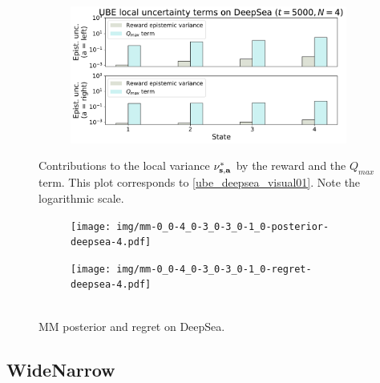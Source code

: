 \documentclass{article}
\begin{document}
\begin{appendices}
\begin{figure}[h!]
\centering
\begin{subfigure}{0.7\textwidth}
\includegraphics[width=\linewidth]{img/ube-uncertainty-terms.pdf}
\end{subfigure}
\captionsetup{width=0.9\linewidth}
\caption{Contributions to the local variance $\nu^*_{\mathbf{s}, \mathbf{a}}$ by the reward and the $Q_{max}$ term. This plot corresponds to \cref{ube_deepsea_visual01}. Note the logarithmic scale.}\label{ube_unc_terms}
\end{figure}

\begin{figure}[h!]
\centering
\begin{subfigure}{0.65\textwidth}
\texttt{[image: img/mm-0\_0-4\_0-3\_0-3\_0-1\_0-posterior-deepsea-4.pdf]}
\end{subfigure}
\begin{subfigure}{0.34\textwidth}
\texttt{[image: img/mm-0\_0-4\_0-3\_0-3\_0-1\_0-regret-deepsea-4.pdf]}~\\~\\
\end{subfigure}
\captionsetup{width=0.9\linewidth}
\caption{MM posterior and regret on DeepSea.}\label{mm_deepsea_visual}
\end{figure}

\clearpage

\subsection{WideNarrow}


\end{appendices}
\end{document}
